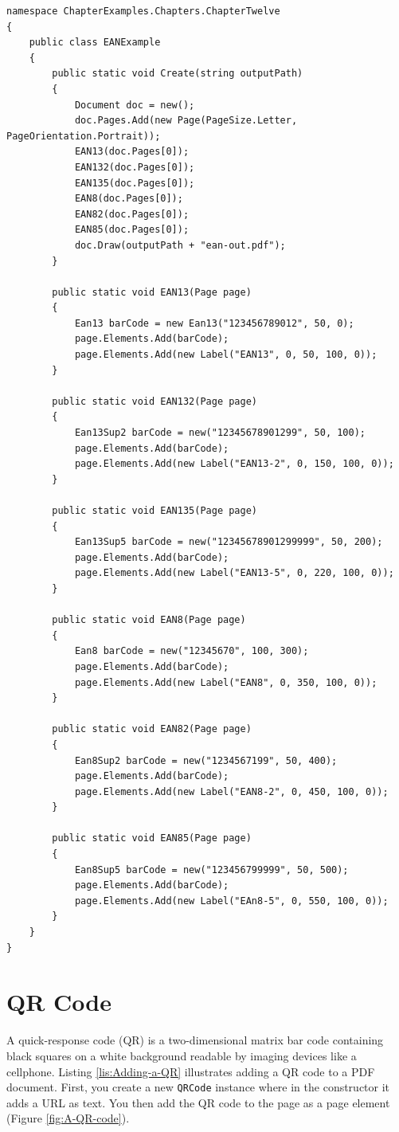 \documentclass[american,letterpaper]{tufte-book}
\numberwithin{equation}{section}
\numberwithin{figure}{section}
\begin{document}
{\begin{lstlisting}[caption={Adding EAN codes to a PDF document.},label={lis:Adding-EAN-codes},basicstyle={\small\ttfamily},breaklines=true]
namespace ChapterExamples.Chapters.ChapterTwelve
{
    public class EANExample
    {
        public static void Create(string outputPath)
        {
            Document doc = new();
            doc.Pages.Add(new Page(PageSize.Letter, PageOrientation.Portrait));
            EAN13(doc.Pages[0]);
            EAN132(doc.Pages[0]);
            EAN135(doc.Pages[0]);
            EAN8(doc.Pages[0]);
            EAN82(doc.Pages[0]);
            EAN85(doc.Pages[0]);
            doc.Draw(outputPath + "ean-out.pdf");
        }

        public static void EAN13(Page page)
        {
            Ean13 barCode = new Ean13("123456789012", 50, 0);
            page.Elements.Add(barCode);
            page.Elements.Add(new Label("EAN13", 0, 50, 100, 0));
        }

        public static void EAN132(Page page)
        {
            Ean13Sup2 barCode = new("12345678901299", 50, 100);
            page.Elements.Add(barCode);
            page.Elements.Add(new Label("EAN13-2", 0, 150, 100, 0));
        }

        public static void EAN135(Page page)
        {
            Ean13Sup5 barCode = new("12345678901299999", 50, 200);
            page.Elements.Add(barCode);
            page.Elements.Add(new Label("EAN13-5", 0, 220, 100, 0));
        }

        public static void EAN8(Page page)
        {
            Ean8 barCode = new("12345670", 100, 300);
            page.Elements.Add(barCode);
            page.Elements.Add(new Label("EAN8", 0, 350, 100, 0));
        }

        public static void EAN82(Page page)
        {
            Ean8Sup2 barCode = new("1234567199", 50, 400);
            page.Elements.Add(barCode);
            page.Elements.Add(new Label("EAN8-2", 0, 450, 100, 0));
        }

        public static void EAN85(Page page)
        {
            Ean8Sup5 barCode = new("123456799999", 50, 500);
            page.Elements.Add(barCode);
            page.Elements.Add(new Label("EAn8-5", 0, 550, 100, 0));
        }
    }
}
\end{lstlisting}
\leavevmode\egroup


\section{QR Code}
A quick-response code (QR) is a two-dimensional matrix bar code containing black squares on a white background readable by imaging
devices like a cellphone. Listing \ref{lis:Adding-a-QR} illustrates adding a QR code to a PDF document. First, you create a
new \texttt{QRCode} instance where in the constructor it adds a URL
as text. You then add the QR code to the page as a page element (Figure
\ref{fig:A-QR-code}).

}
\end{document}
